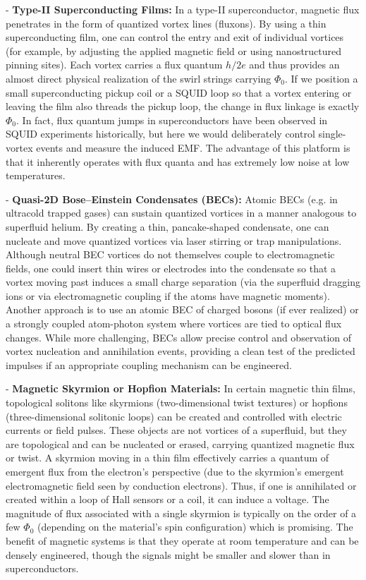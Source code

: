 \documentclass[12pt]{article}
\begin{document}
        - \textbf{Type-II Superconducting Films:} In a type-II superconductor, magnetic flux penetrates in the form of quantized vortex lines (fluxons). By using a thin superconducting film, one can control the entry and exit of individual vortices (for example, by adjusting the applied magnetic field or using nanostructured pinning sites). Each vortex carries a flux quantum $h/2e$ and thus provides an almost direct physical realization of the swirl strings carrying $\Phi_{0}$. If we position a small superconducting pickup coil or a SQUID loop so that a vortex entering or leaving the film also threads the pickup loop, the change in flux linkage is exactly $\Phi_{0}$. In fact, flux quantum jumps in superconductors have been observed in SQUID experiments historically, but here we would deliberately control single-vortex events and measure the induced EMF. The advantage of this platform is that it inherently operates with flux quanta and has extremely low noise at low temperatures.

        - \textbf{Quasi-2D Bose–Einstein Condensates (BECs):} Atomic BECs (e.g. in ultracold trapped gases) can sustain quantized vortices in a manner analogous to superfluid helium. By creating a thin, pancake-shaped condensate, one can nucleate and move quantized vortices via laser stirring or trap manipulations. Although neutral BEC vortices do not themselves couple to electromagnetic fields, one could insert thin wires or electrodes into the condensate so that a vortex moving past induces a small charge separation (via the superfluid dragging ions or via electromagnetic coupling if the atoms have magnetic moments). Another approach is to use an atomic BEC of charged bosons (if ever realized) or a strongly coupled atom-photon system where vortices are tied to optical flux changes. While more challenging, BECs allow precise control and observation of vortex nucleation and annihilation events, providing a clean test of the predicted impulses if an appropriate coupling mechanism can be engineered.

        - \textbf{Magnetic Skyrmion or Hopfion Materials:} In certain magnetic thin films, topological solitons like skyrmions (two-dimensional twist textures) or hopfions (three-dimensional solitonic loops) can be created and controlled with electric currents or field pulses. These objects are not vortices of a superfluid, but they are topological and can be nucleated or erased, carrying quantized magnetic flux or twist. A skyrmion moving in a thin film effectively carries a quantum of emergent flux from the electron's perspective (due to the skyrmion’s emergent electromagnetic field seen by conduction electrons). Thus, if one is annihilated or created within a loop of Hall sensors or a coil, it can induce a voltage. The magnitude of flux associated with a single skyrmion is typically on the order of a few $\Phi_{0}$ (depending on the material’s spin configuration) which is promising. The benefit of magnetic systems is that they operate at room temperature and can be densely engineered, though the signals might be smaller and slower than in superconductors.
\end{document}
